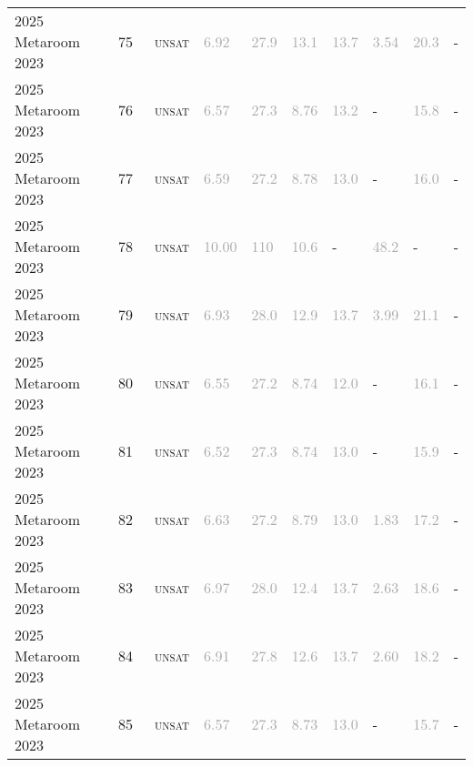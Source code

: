 \begin{center}
{\begin{longtable}{@{}llllllllll@{}}
2025 Metaroom 2023 & 75 & ~\textsc{unsat} & \textcolor{darkgray}{6.92} & \textcolor{darkgray}{27.9} & \textcolor{darkgray}{13.1} & \textcolor{darkgray}{13.7} & \textcolor{darkgray}{3.54} & \textcolor{darkgray}{20.3} & - \\
2025 Metaroom 2023 & 76 & ~\textsc{unsat} & \textcolor{darkgray}{6.57} & \textcolor{darkgray}{27.3} & \textcolor{darkgray}{8.76} & \textcolor{darkgray}{13.2} & - & \textcolor{darkgray}{15.8} & - \\
2025 Metaroom 2023 & 77 & ~\textsc{unsat} & \textcolor{darkgray}{6.59} & \textcolor{darkgray}{27.2} & \textcolor{darkgray}{8.78} & \textcolor{darkgray}{13.0} & - & \textcolor{darkgray}{16.0} & - \\
2025 Metaroom 2023 & 78 & ~\textsc{unsat} & \textcolor{darkgray}{10.00} & \textcolor{darkgray}{110} & \textcolor{darkgray}{10.6} & - & \textcolor{darkgray}{48.2} & - & - \\
2025 Metaroom 2023 & 79 & ~\textsc{unsat} & \textcolor{darkgray}{6.93} & \textcolor{darkgray}{28.0} & \textcolor{darkgray}{12.9} & \textcolor{darkgray}{13.7} & \textcolor{darkgray}{3.99} & \textcolor{darkgray}{21.1} & - \\
2025 Metaroom 2023 & 80 & ~\textsc{unsat} & \textcolor{darkgray}{6.55} & \textcolor{darkgray}{27.2} & \textcolor{darkgray}{8.74} & \textcolor{darkgray}{12.0} & - & \textcolor{darkgray}{16.1} & - \\
2025 Metaroom 2023 & 81 & ~\textsc{unsat} & \textcolor{darkgray}{6.52} & \textcolor{darkgray}{27.3} & \textcolor{darkgray}{8.74} & \textcolor{darkgray}{13.0} & - & \textcolor{darkgray}{15.9} & - \\
2025 Metaroom 2023 & 82 & ~\textsc{unsat} & \textcolor{darkgray}{6.63} & \textcolor{darkgray}{27.2} & \textcolor{darkgray}{8.79} & \textcolor{darkgray}{13.0} & \textcolor{darkgray}{1.83} & \textcolor{darkgray}{17.2} & - \\
2025 Metaroom 2023 & 83 & ~\textsc{unsat} & \textcolor{darkgray}{6.97} & \textcolor{darkgray}{28.0} & \textcolor{darkgray}{12.4} & \textcolor{darkgray}{13.7} & \textcolor{darkgray}{2.63} & \textcolor{darkgray}{18.6} & - \\
2025 Metaroom 2023 & 84 & ~\textsc{unsat} & \textcolor{darkgray}{6.91} & \textcolor{darkgray}{27.8} & \textcolor{darkgray}{12.6} & \textcolor{darkgray}{13.7} & \textcolor{darkgray}{2.60} & \textcolor{darkgray}{18.2} & - \\
2025 Metaroom 2023 & 85 & ~\textsc{unsat} & \textcolor{darkgray}{6.57} & \textcolor{darkgray}{27.3} & \textcolor{darkgray}{8.73} & \textcolor{darkgray}{13.0} & - & \textcolor{darkgray}{15.7} & - \\

\end{longtable}}
\end{center}
